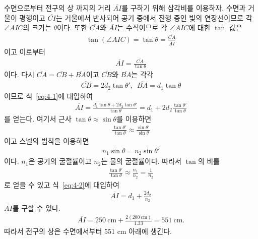 \documentclass[tightenlines,floatfix,nofootinbib,superscriptaddress,fleqn]{revtex4-2}
\begin{document}
수면으로부터 전구의 상 까지의 거리 $\overline{AI}$를 구하기 위해 삼각비를 이용하자.
수면과 거울이 평행이고 $\overline{CI}$는
거울에서 반사되어 공기 중에서 진행 중인 빛의 연장선이므로 각 $\angle AIC$의 크기는 $\theta$이다.
또한 $\overline{CA}$와 $\overline{AI}$는 수직이므로 
각  $\angle AIC$에 대한 $\tan$ 값은
\begin{align}
  \tan(\angle AIC) = \tan\theta = \frac{\overline{CA}}{\overline{AI}}
\end{align}
이고 이로부터
\begin{align}\label{eq:4-1}
  \overline{AI} = \frac{\overline{CA}}{\tan\theta}
\end{align}
이다. 다시 $\overline{CA} =\overline{CB}+\overline{BA} $이고
$\overline{CB}$와 $\overline{BA}$는 각각
\begin{align}
  \overline{CB} = 2d_2\tan\theta',\,\,\,
  \overline{BA} = d_1\tan\theta
\end{align}
이므로 식~\eqref{eq:4-1}에 대입하여
\begin{align}\label{eq:4-2}
  \overline{AI} = \frac{d_1\tan\theta+2d_2\tan\theta'}{\tan\theta}
  =d_1+2d_2\frac{\tan\theta'}{\tan\theta}
\end{align}
를 얻는다. 여기서 근사 $\tan\theta\approx\sin\theta$를 이용하면
\begin{align}
  \frac{\tan\theta'}{\tan\theta}\approx
  \frac{\sin\theta'}{\sin\theta}
\end{align}
이고 스넬의 법칙을 이용하면
\begin{align}
  n_1\sin\theta=n_2\sin\theta'
\end{align}
이다. $n_1$은 공기의 굴절률이고 $n_2$는 물의 굴절률이다. 따라서 $\tan$의 비를
\begin{align}
  \frac{\tan\theta'}{\tan\theta}\approx\frac{n_1}{n_2}
  =\frac{1}{n_2}
\end{align}
로 얻을 수 있고 식~\eqref{eq:4-2}에 대입하여
\begin{align}
  \overline{AI} =d_1+\frac{2d_2}{n_2}
\end{align}
$\overline{AI}$를 구할 수 있다.
\begin{align}
  \overline{AI} =250~\mathrm{cm}+\frac{2(200~\mathrm{cm})}{1.33}
  =551~\mathrm{cm}.
\end{align}
따라서 전구의 상은 수면에서부터 551 cm 아래에 생긴다.
\vspace{1cm}
\end{document}

